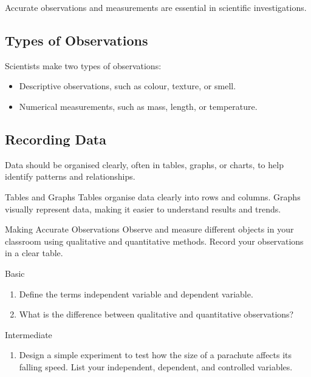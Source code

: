 Accurate observations and measurements are essential in scientific investigations.

\subsection{Types of Observations}

Scientists make two types of observations:

\begin{itemize}
    \item {} Descriptive observations, such as colour, texture, or smell.
    \item {} Numerical measurements, such as mass, length, or temperature.
\end{itemize}

\subsection{Recording Data}

Data should be organised clearly, often in tables, graphs, or charts, to help identify patterns and relationships.

\begin{keyconcept}{Tables and Graphs}
Tables organise data clearly into rows and columns. Graphs visually represent data, making it easier to understand results and trends.
\end{keyconcept}

\begin{investigation}{Making Accurate Observations}
Observe and measure different objects in your classroom using qualitative and quantitative methods. Record your observations in a clear table.
\end{investigation}

\begin{tieredquestions}{Basic}
\begin{enumerate}
    \item Define the terms independent variable and dependent variable.
    \item What is the difference between qualitative and quantitative observations?
\end{enumerate}
\end{tieredquestions}

\begin{tieredquestions}{Intermediate}
\begin{enumerate}
    \item Design a simple experiment to test how the size of a parachute affects its falling speed. List your independent, dependent, and controlled variables.
\end{enumerate}
\end{tieredquestions}

